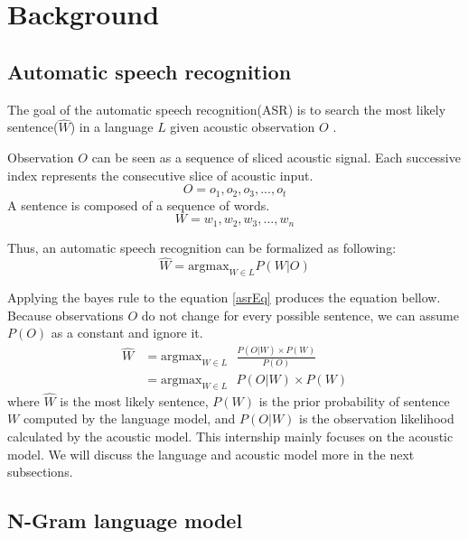 \chapter{Background}

\section{Automatic speech recognition}
\label{subsec:ASR}
The goal of the automatic speech recognition(ASR) is to search the most likely sentence($\hat{W}$) in a language $L$ given acoustic observation $O$ \cite{Jurafsky:2009:SLP:1214993}. 

Observation $O$ can be seen as a sequence of sliced acoustic signal. Each successive index represents the consecutive slice of acoustic input.
\begin{equation}
O=o_{1},o_{2},o_{3},...,o_{t}
\end{equation} 
A sentence is composed of a sequence of words.
\begin{equation}
W = w_{1},w_{2},w_{3},...,w_{n}
\end{equation}


Thus, an automatic speech recognition can be formalized as following:
\begin{equation}
\label{asrEq}
\hat{W} = \textrm{argmax}_{W \in L} P(W|O)
\end{equation}

Applying the bayes rule to the equation \ref{asrEq} produces the equation bellow. Because observations $O$ do not change for every possible sentence, we can assume $P(O)$ as a constant and ignore it.
\begin{align}
\hat{W} & = \textrm{argmax}_{W \in L} \textrm{ } \frac{P(O|W) \times P(W)}{P(O)} \\
	& = \textrm{argmax}_{W \in L} \textrm{ } P(O|W) \times P(W)
\end{align}
where $\hat{W}$ is the most likely sentence, $P(W)$ is the prior probability of sentence $W$ computed by the language model, and $P(O|W)$ is the observation likelihood calculated by the acoustic model. This internship mainly focuses on the acoustic model. We will discuss the language and acoustic model more in the next subsections. 



\section{N-Gram language model}


